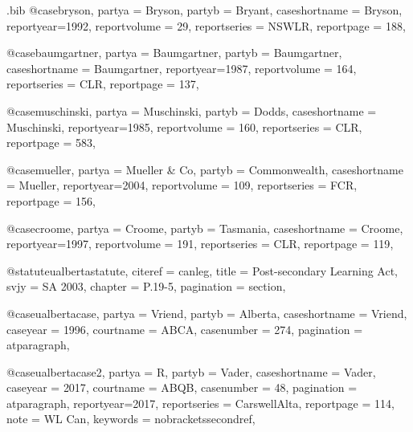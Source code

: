 \begin{filecontents*}[overwrite]{\jobname.bib}
@case{bryson,
  partya = {Bryson}, 
  partyb = {Bryant},
  caseshortname = {Bryson},
  reportyear={1992},
  reportvolume = {29},
  reportseries = {NSWLR},
  reportpage = {188},
}





@case{baumgartner,
  partya = {Baumgartner}, 
  partyb = {Baumgartner},
  caseshortname = {Baumgartner},
  reportyear={1987},
  reportvolume = {164},
  reportseries = {CLR},
  reportpage = {137},
}




@case{muschinski,
  partya = {Muschinski}, 
  partyb = {Dodds},
  caseshortname = {Muschinski},
  reportyear={1985},
  reportvolume = {160},
  reportseries = {CLR},
  reportpage = {583},
}


@case{mueller,
  partya = {Mueller \& Co}, 
  partyb = {Commonwealth},
  caseshortname = {Mueller},
  reportyear={2004},
  reportvolume = {109},
  reportseries = {FCR},
  reportpage = {156},
}


@case{croome,
  partya = {Croome}, 
  partyb = {Tasmania},
  caseshortname = {Croome},
  reportyear={1997},
  reportvolume = {191},
  reportseries = {CLR},
  reportpage = {119},
}



@statute{ualbertastatute,
citeref = {canleg},
title = {Post-secondary Learning Act},
svjy = {SA 2003},
chapter = {P.19-5},
pagination = {section},
}

@case{ualbertacase,
  partya = {Vriend}, 
  partyb = {Alberta},
  caseshortname = {Vriend},
  caseyear = {1996},
  courtname = {ABCA},
  casenumber = {274},
  pagination = {atparagraph},
}


@case{ualbertacase2,
  partya = {R}, 
  partyb = {Vader},
  caseshortname = {Vader},
  caseyear = {2017},
  courtname = {ABQB},
  casenumber = {48},
  pagination = {atparagraph},
  reportyear={2017},
  reportseries = {CarswellAlta},
  reportpage = {114},
  note = {WL Can},
  keywords = {nobracketssecondref},
}



\end{filecontents*}
